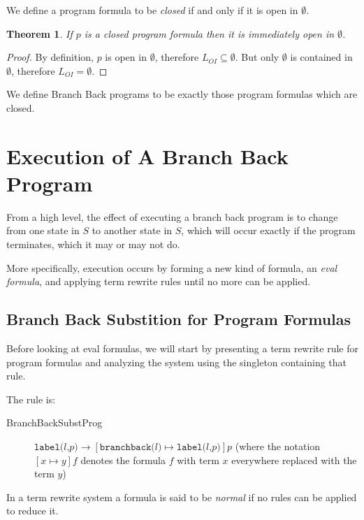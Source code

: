 \documentclass[11pt]{article}
\begin{document}
We define a program formula to be \emph{closed} if and only if it is open in $\emptyset$.

\newtheorem*{closedimmedopeninempty}{Theorem}
\begin{closedimmedopeninempty}
If $p$ is a closed program formula then it is immediately open in $\emptyset$.
\end{closedimmedopeninempty}

\begin{proof}
By definition, $p$ is open in $\emptyset$, therefore $L_{OI} \subseteq \emptyset$.  But only $\emptyset$ is contained in $\emptyset$, therefore $L_{OI} = \emptyset$.
\end{proof}

We define Branch Back programs to be exactly those program formulas which are closed.

\section{Execution of A Branch Back Program}

From a high level, the effect of executing a branch back program is to change from one state in $S$ to another state in $S$, which will occur exactly if the program terminates, which it may or may not do.

More specifically, execution occurs by forming a new kind of formula, an \emph{eval formula}, and applying term rewrite rules until no more can be applied.

\subsection{Branch Back Substition for Program Formulas}

Before looking at eval formulas, we will start by presenting a term rewrite rule for program formulas and analyzing the system using the singleton containing that rule.

The rule is:

\begin{description}
\item[BranchBackSubstProg] $\texttt{label(}l\texttt{,} p\texttt{)} \longrightarrow [\texttt{branchback(}l\texttt{)} \mapsto \texttt{label(}l\texttt{,} p\texttt{)}]p$ (where the notation $[x \mapsto y]f$ denotes the formula $f$ with term $x$ everywhere replaced with the term $y$)
\end{description}

In a term rewrite system a formula is said to be \emph{normal} if no rules can be applied to reduce it.
\end{document}
